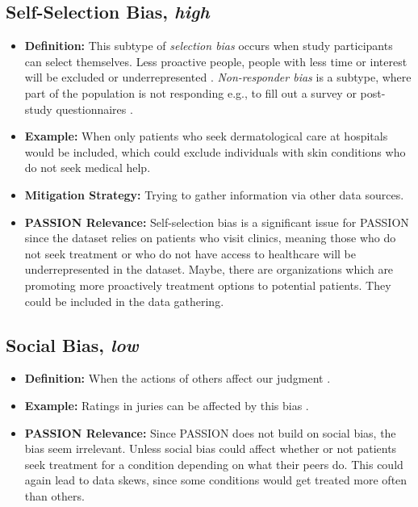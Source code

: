 \documentclass[12pt, a4paper, oneside]{book}   	%
\begin{document}
\begin{appendices}
		\subsection{Self-Selection Bias, \textit{high}}
		\begin{itemize}
			\item \textbf{Definition:} This subtype of \textit{selection bias} occurs when study participants can select themselves. Less proactive people, people with less time or interest will be excluded or underrepresented \autocite{Mester_2022,Mehrabi_2021}. \textit{Non-responder bias} is a subtype, where part of the population is not responding e.g., to fill out a survey or post-study questionnaires \autocite{Chakraborty_2024}.
			\item \textbf{Example:} When only patients who seek dermatological care at hospitals would be included, which could exclude individuals with skin conditions who do not seek medical help.
			\item \textbf{Mitigation Strategy:} Trying to gather information via other data sources.
			\item \textbf{PASSION Relevance:} Self-selection bias is a significant issue for PASSION since the dataset relies on patients who visit clinics, meaning those who do not seek treatment or who do not have access to healthcare will be underrepresented in the dataset. Maybe, there are organizations which are promoting more proactively treatment options to potential patients. They could be included in the data gathering. 
		\end{itemize}
		
		\subsection{Social Bias, \textit{low}}
		\begin{itemize}
			\item \textbf{Definition:} When the actions of others affect our judgment \autocite{M9_Baeza-Yates_2018}.
			\item \textbf{Example:} Ratings in juries can be affected by this bias \autocite{M9_Baeza-Yates_2018}.
			\item \textbf{PASSION Relevance:} Since PASSION does not build on social bias, the bias seem irrelevant. Unless social bias could affect whether or not patients seek treatment for a condition depending on what their peers do. This could again lead to data skews, since some conditions would get treated more often than others. 
		\end{itemize}
		

\end{appendices}
\end{document}
